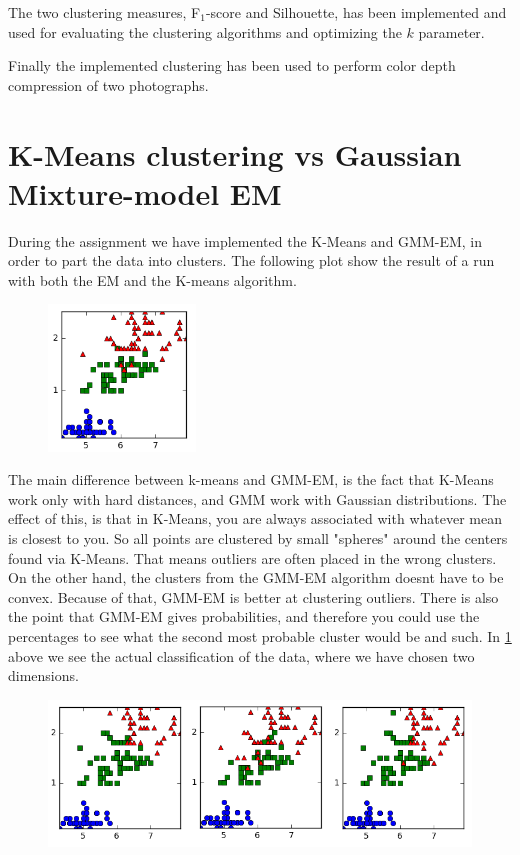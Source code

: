 \documentclass[a4paper,10pt,article,oneside,english]{memoir}
\let\oldcaption\caption
\renewcommand{\caption}[1]{\oldcaption{\emph{#1}}}
\begin{document}
The two clustering measures, F$_1$-score and Silhouette, has been implemented and used for evaluating the clustering algorithms and optimizing the $k$ parameter. 

Finally the implemented clustering has been used to perform color depth compression of two photographs. 

\section*{K-Means clustering vs Gaussian Mixture-model EM}
During the assignment we have implemented the K-Means and GMM-EM, in order to part the data into clusters. The following plot show the result of a run with both the EM and the K-means algorithm.
\begin{figure}
	\centering
	\includegraphics[width=0.35\textwidth]{original.png}
	\caption{}
	\label{fig:orig}
\end{figure}
The main difference between k-means and GMM-EM, is the fact that K-Means work only with hard distances, and GMM work with Gaussian distributions. The effect of this, is that in K-Means, you are always associated with whatever mean is closest to you. So all points are clustered by small "spheres" around the centers found via K-Means. That means outliers are often placed in the wrong clusters. On the other hand, the clusters from the GMM-EM algorithm doesnt have to be convex. Because of that, GMM-EM is better at clustering outliers.
There is also the point that GMM-EM gives probabilities, and therefore you could use the percentages to see what the second most probable cluster would be and such.
In \ref{fig:orig} above we see the actual classification of the data, where we have chosen two dimensions.
\begin{figure}
	\centering
	\includegraphics[width=\textwidth]{kmeans1.png}
	\caption{}
	\label{fig:km}
\end{figure}
\end{document}
